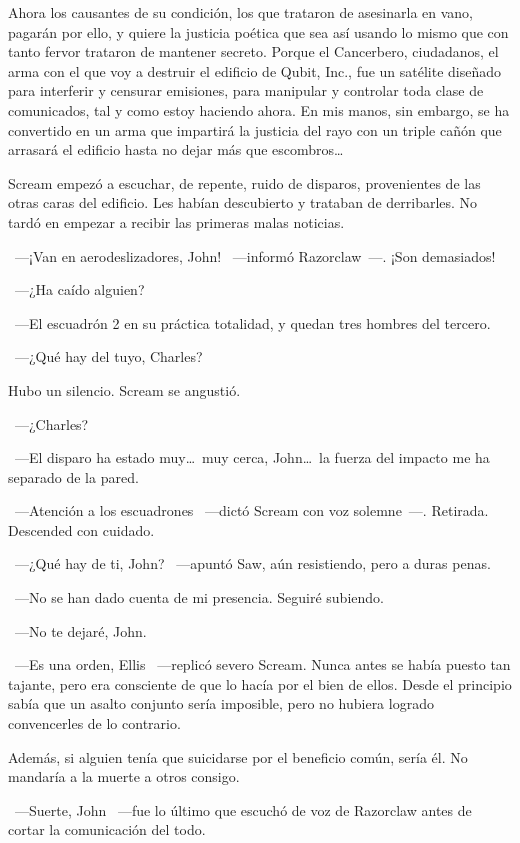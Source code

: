 \rquoti Ahora los causantes de su condición, los que trataron de asesinarla en vano, pagarán por ello, y quiere la justicia poética que sea así usando lo mismo que con tanto fervor trataron de mantener secreto. Porque el Cancerbero, ciudadanos, el arma con el que voy a destruir el edificio de Qubit, Inc., fue un satélite diseñado para interferir y censurar emisiones, para manipular y controlar toda clase de comunicados, tal y como estoy haciendo ahora. En mis manos, sin embargo, se ha convertido en un arma que impartirá la justicia del rayo con un triple cañón que arrasará el edificio hasta no dejar más que escombros\dots

Scream empezó a escuchar, de repente, ruido de disparos, provenientes de las otras caras del edificio. Les habían descubierto y trataban de derribarles. No tardó en empezar a recibir las primeras malas noticias.

~---¡Van en aerodeslizadores, John! ~---informó Razorclaw~---. ¡Son demasiados!

~---¿Ha caído alguien?

~---El escuadrón 2 en su práctica totalidad, y quedan tres hombres del tercero.

~---¿Qué hay del tuyo, Charles?

Hubo un silencio. Scream se angustió.

~---¿Charles?

~---El disparo ha estado muy\dots\ muy cerca, John\dots\ la fuerza del impacto me ha separado de la pared.

~---Atención a los escuadrones ~---dictó Scream con voz solemne~---. Retirada. Descended con cuidado.

~---¿Qué hay de ti, John? ~---apuntó Saw, aún resistiendo, pero a duras penas.

~---No se han dado cuenta de mi presencia. Seguiré subiendo.

~---No te dejaré, John.

~---Es una orden, Ellis ~---replicó severo Scream. Nunca antes se había puesto tan tajante, pero era consciente de que lo hacía por el bien de ellos. Desde el principio sabía que un asalto conjunto sería imposible, pero no hubiera logrado convencerles de lo contrario.

Además, si alguien tenía que suicidarse por el beneficio común, sería él. No mandaría a la muerte a otros consigo.

~---Suerte, John ~---fue lo último que escuchó de voz de Razorclaw antes de cortar la comunicación del todo.

